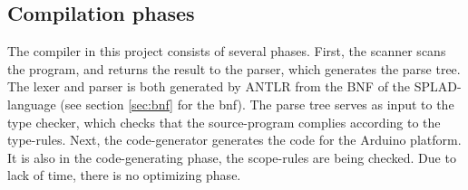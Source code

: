 \subsection{Compilation phases}
The compiler in this project consists of several phases. First, the scanner scans the program, and returns the result to the parser, which generates the parse tree. The lexer and parser is both generated by ANTLR \citep{ANTLR} from the BNF of the SPLAD-language (see section \ref{sec:bnf} for the bnf). The parse tree serves as input to the type checker, which checks that the source-program complies according to the type-rules. Next, the code-generator generates the code for the Arduino platform. It is also in the code-generating phase, the scope-rules are being checked. Due to lack of time, there is no optimizing phase. 
